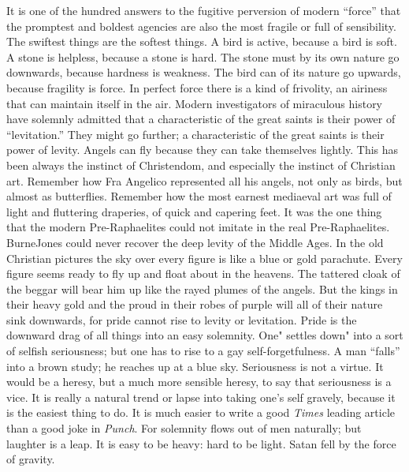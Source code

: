 \documentclass{book}
\begin{document}
It is one of the hundred answers to the fugitive perversion of modern “force” that the promptest and boldest agencies are also the most fragile or full of sensibility. The swiftest things are the softest things. A bird is active, because a bird is soft. A stone is helpless, because a stone is hard. The stone must by its own nature go downwards, because hardness is weakness. The bird can of its nature go upwards, because fragility is force. In perfect force there is a kind of frivolity, an airiness that can maintain itself in the air. Modern investigators of miraculous history have solemnly admitted that a characteristic of the great saints is their power of “levitation.” They might go further; a characteristic of the great saints is their power of levity. Angels can fly because they can take themselves lightly. This has been always the instinct of Christendom, and especially the instinct of Christian art. Remember how Fra Angelico represented all his angels, not only as birds, but almost as butterflies. Remember how the most earnest mediaeval art was full of light and fluttering draperies, of quick and capering feet. It was the one thing that the modern Pre-Raphaelites could not imitate in the real Pre-Raphaelites. BurneJones could never recover the deep levity of the Middle Ages. In the old Christian pictures the sky over every figure is like a blue or gold parachute. Every figure seems ready to fly up and float about in the heavens. The tattered cloak of the beggar will bear him up like the rayed plumes of the angels. But the kings in their heavy gold and the proud in their robes of purple will all of their nature sink downwards, for pride cannot rise to levity or levitation. Pride is the downward drag of all things into an easy solemnity. One" settles down" into a sort of selfish seriousness; but one has to rise to a gay self-forgetfulness. A man “falls” into a brown study; he reaches up at a blue sky. Seriousness is not a virtue. It would be a heresy, but a much more sensible heresy, to say that seriousness is a vice. It is really a natural trend or lapse into taking one’s self gravely, because it is the easiest thing to do. It is much easier to write a good \emph{Times} leading article than a good joke in \emph{Punch}. For solemnity flows out of men naturally; but laughter is a leap. It is easy to be heavy: hard to be light. Satan fell by the force of gravity.
\end{document}
